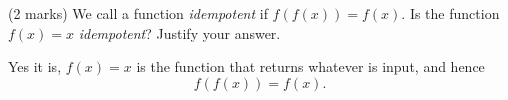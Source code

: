 \documentclass[12pt]{article} %
\begin{document}
\begin{qstn}
\begin{enumerate}[label=(\alph*)]
\begin{center}
    \end{center}
  \end{enumerate}
\end{qstn}

\newpage


\begin{qstn}
  (2 marks) We call a function \emph{idempotent} if $f(f(x)) = f(x)$. Is the function \\
  $f(x) = x$ \emph{idempotent}? Justify your answer.
\end{qstn}
\begin{solution}
  Yes it is,  $f(x) = x$ is the function that returns whatever is input, and hence
  \[
        f(f(x)) = f(x)
  .\] 
\end{solution}
\end{document}
